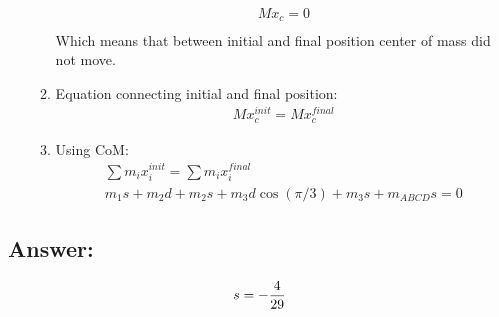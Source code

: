 \begin{enumerate}
\begin{enumerate}
\begin{align}
                        M x_c = 0   \\
                    \end{align}
                    Which means that between initial and final position center of mass did not move.
              \item Equation connecting initial and final position:
                    \begin{align}
                        M x^{init}_{c} = M x^{final}_{c}
                    \end{align}
              \item Using CoM:
                    \begin{align}
                        \sum m_i x^{init}_i = \sum m_i x^{final}_i \\
                        m_1 s + m_2 d + m_2 s + m_3 d \cos(\pi / 3) + m_3 s + m_{ABCD} s = 0
                    \end{align}
          \end{enumerate}
\end{enumerate}
\subsection*{Answer:}
\begin{answer}
    \begin{align}
        s = -\frac{4}{29} \notag
    \end{align}
\end{answer}